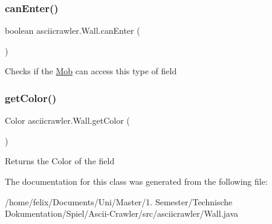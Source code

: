 \subsubsection{\texorpdfstring{can\+Enter()}{canEnter()}}
{\footnotesize\ttfamily boolean asciicrawler.\+Wall.\+can\+Enter (\begin{DoxyParamCaption}{ }\end{DoxyParamCaption})\hspace{0.3cm}{\ttfamily [inline]}}

Checks if the \hyperlink{classasciicrawler_1_1Mob}{Mob} can access this type of field \mbox{\label{classasciicrawler_1_1Wall_a357f77acaa033e6d59b5973459954bb8}} 
\subsubsection{\texorpdfstring{get\+Color()}{getColor()}}
{\footnotesize\ttfamily Color asciicrawler.\+Wall.\+get\+Color (\begin{DoxyParamCaption}{ }\end{DoxyParamCaption})\hspace{0.3cm}{\ttfamily [inline]}}

Returns the Color of the field 

The documentation for this class was generated from the following file\+:\begin{DoxyCompactItemize}
\item 
/home/felix/\+Documents/\+Uni/\+Master/1. Semester/\+Technische Dokumentation/\+Spiel/\+Ascii-\/\+Crawler/src/asciicrawler/Wall.\+java\end{DoxyCompactItemize}
